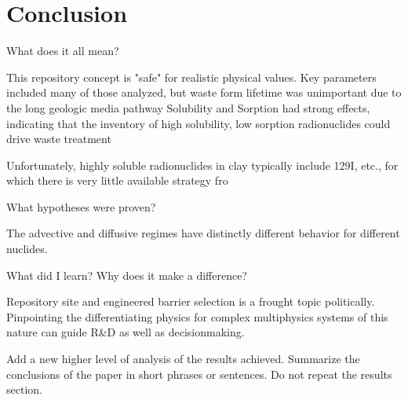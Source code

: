 \section{Conclusion}


What does it all mean? 

This repository concept is "safe" for realistic physical values.
Key parameters included many of those analyzed, but waste form lifetime was unimportant due to the long geologic media pathway
Solubility and Sorption had strong effects, indicating that the inventory of high solubility, low sorption radionuclides could drive waste treatment

Unfortunately, highly soluble radionuclides in clay typically include 129I, etc., for which there is very little available strategy fro 


What hypotheses were proven?

The advective and diffusive regimes have distinctly different behavior for different nuclides.

What did I learn? 
Why does it make a difference? 

Repository site and engineered barrier selection is a frought topic politically. Pinpointing the differentiating physics for complex multiphysics systems of this nature can guide R&D as well as decisionmaking. 

Add a new higher level of analysis of the results achieved. Summarize the conclusions of the paper in short phrases or sentences. Do not repeat the results section.



